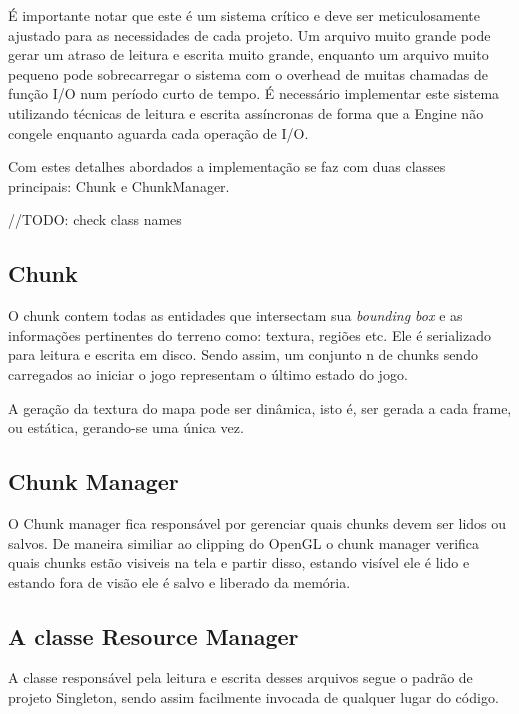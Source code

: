 \documentclass[12pt, 
openright, 
oneside, 
a4paper,    
brazil]{facom-ufu-abntex2}
\begin{document}
É importante notar que este é um sistema crítico e deve ser meticulosamente ajustado para as necessidades de cada projeto. Um arquivo muito grande pode gerar um atraso de leitura e escrita muito grande, enquanto um arquivo muito pequeno pode sobrecarregar o sistema com o overhead de muitas chamadas de função I/O num período curto de tempo. É necessário implementar este sistema utilizando técnicas de leitura e escrita assíncronas de forma que a Engine não congele enquanto aguarda cada operação de I/O.

Com estes detalhes abordados a implementação se faz com duas classes principais: Chunk e ChunkManager. 

//TODO: check class names

\subsection{Chunk}
O chunk contem todas as entidades que intersectam sua \textit{bounding box} e as informações pertinentes do terreno como: textura, regiões etc. Ele é serializado para leitura e escrita em disco. Sendo assim, um conjunto n de chunks sendo carregados ao iniciar o jogo representam o último estado do jogo.

A geração da textura do mapa pode ser dinâmica, isto é, ser gerada a cada frame, ou estática, gerando-se uma única vez.

\subsection{Chunk Manager}
O Chunk manager fica responsável por gerenciar quais chunks devem ser lidos ou salvos. De maneira similiar ao clipping do OpenGL o chunk manager verifica quais chunks estão visiveis na tela e partir disso, estando visível ele é lido e estando fora de visão ele é salvo e liberado da memória.

\subsection{A classe Resource Manager}
A classe responsável pela leitura e escrita desses arquivos segue o padrão de projeto Singleton, sendo assim facilmente invocada de qualquer lugar do código.
\end{document}

